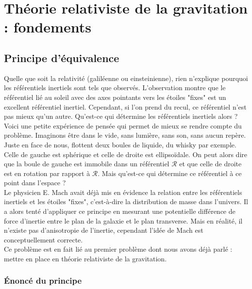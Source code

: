 \documentclass[a4paper,11pt]{report}
\theoremstyle{definition}
\theoremstyle{plain}
\theoremstyle{definition}
\theoremstyle{remark}
\newcommand{\R}{\mathcal{R}}
\begin{document}
\chapter{Théorie relativiste de la gravitation : fondements}

    \section{Principe d'équivalence}
    
        Quelle que soit la relativité (galiléenne ou einsteinienne), rien n'explique pourquoi les référentiels inertiels sont tels que observés. L'observation montre que le référentiel lié au soleil avec des axes pointants vers les étoiles "fixes" est un excellent référentiel inertiel. Cependant, si l'on prend du recul, ce référentiel n'est pas mieux qu'un autre. Qu'est-ce qui détermine les référentiels inertiels alors ?\\
            
        Voici une petite expérience de pensée qui permet de mieux se rendre compte du problème. Imaginons être dans le vide, sans lumière, sans son, sans aucun repère. Juste en face de nous, flottent deux boules de liquide, du whisky par exemple. Celle de gauche est sphérique et celle de droite est ellipsoïdale. On peut alors dire que la boule de gauche est immobile dans un référentiel $\R$ et que celle de droite est en rotation par rapport à $\R$. Mais qu'est-ce qui détermine ce référentiel à ce point dans l'espace ?\\
        
        Le physicien E. Mach avait déjà mis en évidence la relation entre les référentiels inertiels et les étoiles "fixes", c'est-à-dire la distribution de masse dans l'univers. Il a alors tenté d'appliquer ce principe en mesurant une potentielle différence de force d'inertie entre le plan de la galaxie et le plan transverse. Mais en réalité, il n'existe pas d'anisotropie de l'inertie, cependant l'idée de Mach est conceptuellement correcte.\\
        
        Ce problème est en fait lié au premier problème dont nous avons déjà parlé : mettre en place en théorie relativiste de la gravitation.
    
        \subsection{Énoncé du principe}
        
\end{document}
